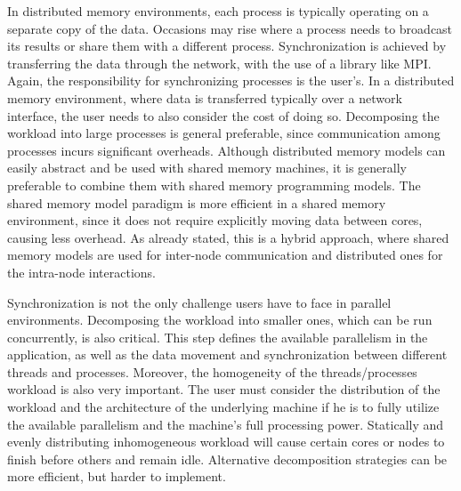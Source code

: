 In distributed memory environments, each process is typically operating on a separate copy
of the data.  Occasions may rise where a process needs to broadcast its results or share
them with a different process.  Synchronization is achieved by transferring the data
through the network, with the use of a library like MPI.  Again, the responsibility for
synchronizing processes is the user's.  In a distributed memory environment, where data is
transferred typically over a network interface, the user needs to also consider the cost
of doing so.  Decomposing the workload into large processes is general preferable, since
communication among processes incurs significant overheads.  Although distributed memory
models can easily abstract and be used with shared memory machines, it is generally
preferable to combine them with shared memory programming models.  The shared memory model
paradigm is more efficient in a shared memory environment, since it does not require
explicitly moving data between cores, causing less overhead.  As already stated, this is a
hybrid approach, where shared memory models are used for inter-node communication and
distributed ones for the intra-node interactions.  

Synchronization is not the only challenge users have to face in parallel environments.
Decomposing the workload into smaller ones, which can be run concurrently, is also
critical.  This step defines the available parallelism in the application, as well as the
data movement and synchronization between different threads and processes.  Moreover, the
homogeneity of the threads/processes workload is also very important.  The user must
consider the distribution of the workload and the architecture of the underlying machine
if he is to fully utilize the available parallelism and the machine's full processing
power.  Statically and evenly distributing inhomogeneous workload will cause certain cores
or nodes to finish before others and remain idle.  Alternative decomposition strategies
can be more efficient, but harder to implement.

